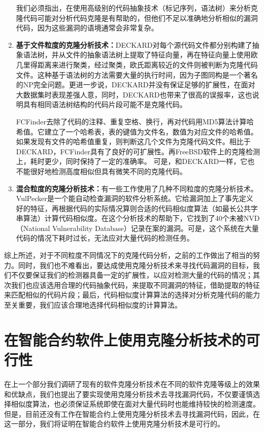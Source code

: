 \begin{enumerate}
      我们必须指出，在使用高级别的代码抽象技术（标记序列，语法树）来分析克隆代码可能对分析代码克隆是有帮助的，但他们不足以准确地分析相似的漏洞代码，因为这些漏洞的语境通常会非常复杂。
  \item \textbf{基于文件粒度的克隆分析技术：}DECKARD\cite{deckard}对每个源代码文件都分别构建了抽象语法树，并从文件的抽象语法树上提取了特征向量，再在特征向量上使用欧几里得距离来进行聚类，经过聚类，欧氏距离较近的文件则被判断为克隆代码文件。这种基于语法树的方法需要大量的执行时间，因为子图同构是一个著名的NP完全问题。更进一步说，DECKARD并没有保证足够的扩展性，在面对大数据集时表现差强人意，同时，DECKARD也带来了很高的误报率，这也说明具有相同语法树结构的代码片段可能不是克隆代码。

      FCFinder\cite{fcfinder}去除了代码的注释、重复空格、换行，再对代码用MD5算法计算哈希值。它建立了一个哈希表，表的键值为文件名，数值为对应文件的哈希值。如果发现有文件的哈希值重复，则判断这几个文件为克隆代码文件。相比于DECKARD，FCFinder具有了良好的可扩展性。再FreeBSD软件上的克隆检测上，耗时更少，同时保持了一定的准确率。 可是，和DECKARD一样，它也不能很好地检测高度相似但具有微笑不同的克隆代码。
  \item \textbf{混合粒度的克隆分析技术：}有一些工作使用了几种不同粒度的克隆分析技术。VulPecker\cite{vulpecker}是一个能自动检查漏洞的软件分析系统。它给漏洞加上了事先定义好的特征，再根据代码的实际情况算则合适的代码相似度算法（如最长公共字串算法）计算代码相似度。在这个分析技术的帮助下，它找到了40个未被NVD（National Vulnerability Database）记录在案的漏洞。可是，这个系统在大量代码的情况下耗时过长，无法应对大量代码的检测任务。
\end{enumerate}

综上所述，对于不同粒度不同情况下的克隆代码分析，之前的工作做出了相当的努力。同时，我们也不难看出，要达成使用克隆分析技术来寻找代码漏洞的目标，我们不仅要保证我们的检测器具备一定的扩展性，以应对检测大量的代码的情况；其次我们也应该选用合理的代码抽象代码，来提取不同漏洞的特征，借助提取的特征来匹配相似的代码片段；最后，代码相似度计算算法的选择对分析克隆代码的能力至关重要，我们应该合理地选择代码相似度的计算算法。

\section{在智能合约软件上使用克隆分析技术的可行性}

在上一个部分我们调研了现有的软件克隆分析技术在不同的软件克隆等级上的效果和优缺点，我们也提出了要实现使用克隆分析技术去寻找漏洞代码，不仅要谨慎选择相似度算法，也必须保证系统即使在面对大量代码时也能维持较快的检测速度。但是，目前还没有工作在智能合约上使用克隆分析技术去寻找漏洞代码，因此，在这一部分，我们将证明在智能合约软件上使用克隆分析技术是可行的。

